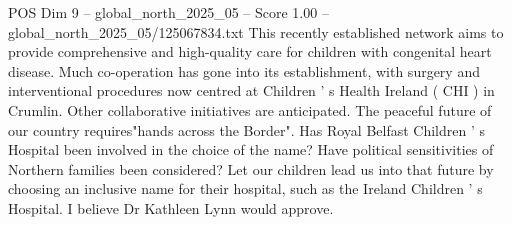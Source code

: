 \begin{textsample}{POS Dim 9 – global\_north\_2025\_05 – Score 1.00 – global\_north\_2025\_05/125067834.txt}
This recently established network aims to provide comprehensive and high-quality care for children with congenital heart disease.
Much co-operation has gone into its establishment, with surgery and interventional procedures now centred at Children ' s Health Ireland ( CHI ) in Crumlin.
Other collaborative initiatives are anticipated.
The peaceful future of our country requires"hands across the Border".
Has Royal Belfast Children ' s Hospital been involved in the choice of the name?
Have political sensitivities of Northern families been considered?
Let our children lead us into that future by choosing an inclusive name for their hospital, such as the Ireland Children ' s Hospital.
I believe Dr Kathleen Lynn would approve.

\end{textsample}
